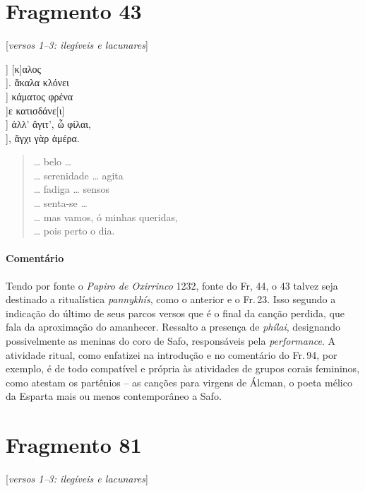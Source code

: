 {\pagebreak
\section{Fragmento 43} 

\begin{gkverse}
\textnormal{[\textit{versos 1--3: ilegíveis e lacunares}]}

] [κ]αλος\\
         ]. ἄκαλα κλόνει\\
         ] κάματος φρένα\\
       ]ε κατισδάνε[ι]\\
       ] ἀλλ’ ἄγιτ’, ὦ φίλαι,\\
       ], ἄγχι γὰρ ἀμέρα.
\end{gkverse}

\begin{verse}
\ldots{} belo \ldots{}\\
\ldots{} serenidade \ldots{} agita\\
\ldots{} fadiga \ldots{} sensos\\
\ldots{} senta-se \ldots{}\\
\ldots{} mas vamos, ó minhas queridas,\\
\ldots{} pois perto o dia.
\end{verse}

\medskip

{\paragraph{Comentário} Tendo por fonte o \textit{Papiro de Oxirrinco} 1232, fonte do Fr, 44, o 43 talvez seja destinado a ritualística \textit{pannykhís}, como o anterior e o Fr.\,23. Isso segundo a indicação do último de seus parcos versos que é o final da canção perdida, que fala da aproximação do amanhecer. Ressalto a presença de \textit{phílai}, designando possivelmente as meninas do coro de Safo, responsáveis pela \textit{performance}. A atividade ritual, como enfatizei na introdução e no comentário do Fr.\,94, por exemplo, é de todo compatível e própria às atividades de grupos corais femininos, como atestam os partênios -- as canções para virgens de Álcman, o poeta mélico da Esparta mais ou menos contemporâneo a Safo.}


\pagebreak
\section{Fragmento 81}

\begin{gkverse}
\textnormal{[\textit{versos 1--3: ilegíveis e lacunares}]}


\end{gkverse}}
